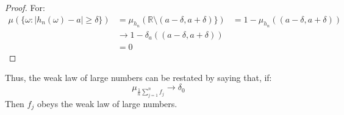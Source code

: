     \begin{proof}
        For:
        \begin{align}
            \mu(\{\omega:|h_{n}(\omega)-a|\geq\delta\})
            &=\mu_{h_{n}}
                (\mathbb{R}\setminus(a-\delta,a+\delta)\})
            &=1-\mu_{h_{n}}((a-\delta,a+\delta))\\
            &\rightarrow{1}-\delta_{a}((a-\delta,a+\delta))\\
            &=0
        \end{align}
    \end{proof}
    Thus, the weak law of large numbers can be restated by
    saying that, if:
    \begin{equation}
        \mu_{\frac{1}{n}\sum_{j=1}^{n}f_{j}}\rightarrow
        \delta_{0}
    \end{equation}
    Then $f_{j}$ obeys the weak law of large numbers.
